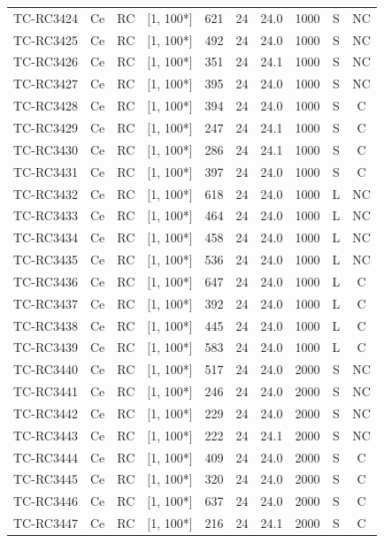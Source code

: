 \begin{longtable}{lccccccccc}
TC-RC3424 & Ce & RC & [1, 100*] & 621 & 24 & 24.0 & 1000 & S & NC \\
TC-RC3425 & Ce & RC & [1, 100*] & 492 & 24 & 24.0 & 1000 & S & NC \\
TC-RC3426 & Ce & RC & [1, 100*] & 351 & 24 & 24.1 & 1000 & S & NC \\
TC-RC3427 & Ce & RC & [1, 100*] & 395 & 24 & 24.0 & 1000 & S & NC \\
TC-RC3428 & Ce & RC & [1, 100*] & 394 & 24 & 24.0 & 1000 & S & C \\
TC-RC3429 & Ce & RC & [1, 100*] & 247 & 24 & 24.1 & 1000 & S & C \\
TC-RC3430 & Ce & RC & [1, 100*] & 286 & 24 & 24.1 & 1000 & S & C \\
TC-RC3431 & Ce & RC & [1, 100*] & 397 & 24 & 24.0 & 1000 & S & C \\
TC-RC3432 & Ce & RC & [1, 100*] & 618 & 24 & 24.0 & 1000 & L & NC \\
TC-RC3433 & Ce & RC & [1, 100*] & 464 & 24 & 24.0 & 1000 & L & NC \\
TC-RC3434 & Ce & RC & [1, 100*] & 458 & 24 & 24.0 & 1000 & L & NC \\
TC-RC3435 & Ce & RC & [1, 100*] & 536 & 24 & 24.0 & 1000 & L & NC \\
TC-RC3436 & Ce & RC & [1, 100*] & 647 & 24 & 24.0 & 1000 & L & C \\
TC-RC3437 & Ce & RC & [1, 100*] & 392 & 24 & 24.0 & 1000 & L & C \\
TC-RC3438 & Ce & RC & [1, 100*] & 445 & 24 & 24.0 & 1000 & L & C \\
TC-RC3439 & Ce & RC & [1, 100*] & 583 & 24 & 24.0 & 1000 & L & C \\
TC-RC3440 & Ce & RC & [1, 100*] & 517 & 24 & 24.0 & 2000 & S & NC \\
TC-RC3441 & Ce & RC & [1, 100*] & 246 & 24 & 24.0 & 2000 & S & NC \\
TC-RC3442 & Ce & RC & [1, 100*] & 229 & 24 & 24.0 & 2000 & S & NC \\
TC-RC3443 & Ce & RC & [1, 100*] & 222 & 24 & 24.1 & 2000 & S & NC \\
TC-RC3444 & Ce & RC & [1, 100*] & 409 & 24 & 24.0 & 2000 & S & C \\
TC-RC3445 & Ce & RC & [1, 100*] & 320 & 24 & 24.0 & 2000 & S & C \\
TC-RC3446 & Ce & RC & [1, 100*] & 637 & 24 & 24.0 & 2000 & S & C \\
TC-RC3447 & Ce & RC & [1, 100*] & 216 & 24 & 24.1 & 2000 & S & C \\

\end{longtable}
